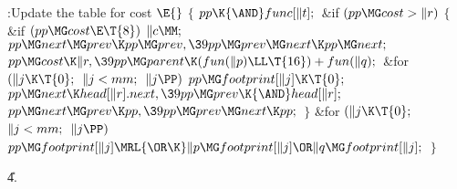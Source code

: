 \B{}:Update the table for cost \X${}\E{}$\6
${}\{{}$\1\6
${}\\{pp}\K{\AND}\\{func}[\|t];{}$\6
\&{if} ${}(\\{pp}\MG\\{cost}>\|r){}$\5
${}\{{}$\1\6
\&{if} ${}(\\{pp}\MG\\{cost}\E\T{8}){}$\1\5
${}\|c\MM;{}$\2\6
${}\\{pp}\MG\\{next}\MG\\{prev}\K\\{pp}\MG\\{prev},\39\\{pp}\MG\\{prev}\MG%
\\{next}\K\\{pp}\MG\\{next};{}$\6
${}\\{pp}\MG\\{cost}\K\|r,\39\\{pp}\MG\\{parent}\K(\\{fun}(\|p)\LL\T{16})+%
\\{fun}(\|q);{}$\6
\&{for} ${}(\|j\K\T{0};{}$ ${}\|j<\\{mm};{}$ ${}\|j\PP){}$\1\5
${}\\{pp}\MG\\{footprint}[\|j]\K\T{0};{}$\2\6
${}\\{pp}\MG\\{next}\K\\{head}[\|r].\\{next},\39\\{pp}\MG\\{prev}\K{\AND}%
\\{head}[\|r];{}$\6
${}\\{pp}\MG\\{next}\MG\\{prev}\K\\{pp},\39\\{pp}\MG\\{prev}\MG\\{next}\K%
\\{pp};{}$\6
\4${}\}{}$\2\6
\&{for} ${}(\|j\K\T{0};{}$ ${}\|j<\\{mm};{}$ ${}\|j\PP){}$\1\5
${}\\{pp}\MG\\{footprint}[\|j]\MRL{{\OR}{\K}}\|p\MG\\{footprint}[\|j]\OR\|q\MG%
\\{footprint}[\|j];{}$\2\6
\4${}\}{}$\2\par
\U4.\fi

